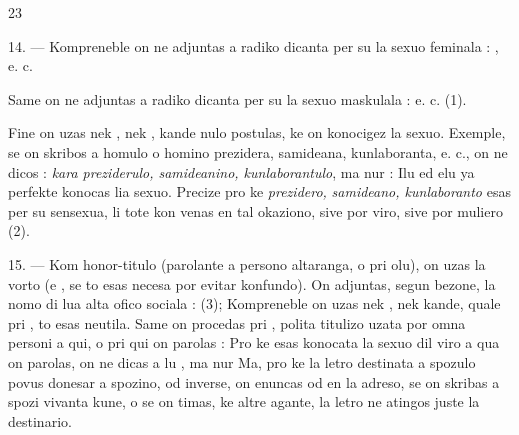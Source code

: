 \begin{VUpage}[27]{23}

14. --- Kompreneble on ne adjuntas  a radiko dicanta\nl
per su la sexuo feminala : , e. c.

Same on ne adjuntas  a radiko dicanta per su la sexuo\nl
maskulala : \nl
e. c. (1).

Fine on uzas nek , nek , kande nulo postulas, ke on\nl
konocigez la sexuo. Exemple, se on skribos a homulo o\nl
homino prezidera, samideana, kunlaboranta, e. c., on ne\nl
dicos : \textit{kara preziderulo, samideanino, kunlaborantulo}, ma\nl
nur :  Ilu ed elu\nl
ya perfekte konocas lia sexuo. Precize pro ke \textit{prezidero,}\nl
\textit{samideano, kunlaboranto} esas per su sensexua, li tote kon\cc
venas en tal okaziono, sive por viro, sive por muliero (2).

15. --- Kom honor-titulo (parolante a persono altaranga,\nl
o pri olu), on uzas la vorto  (e ,\nl
se to esas necesa por evitar konfundo). On adjuntas, segun\cc
bezone, la nomo di lua alta ofico sociala : \nl
{} (3); \cc
{} Kompreneble on uzas nek , nek  kande, quale pri\nl
{}, to esas neutila. Same on procedas pri , polita\nl
titulizo uzata por omna personi a qui, o pri qui on parolas :\nl
{} Pro ke esas konocata la sexuo dil viro a\nl
qua on parolas, on ne dicas a lu , ma nur \nl
Ma, pro ke la letro destinata a spozulo povus donesar a\nl
spozino, od inverse, on enuncas  od  en la adreso, se\nl
on skribas a spozi vivanta kune, o se on timas, ke altre\nl
agante, la letro ne atingos juste la destinario.


\end{VUpage}
